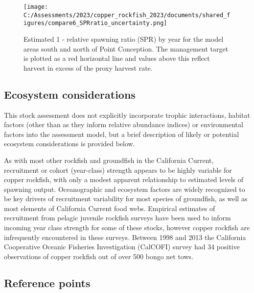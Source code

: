 \documentclass[11pt,
  english,
  letterpaper,
]{article}
\begin{document}


\newpage



\begin{figure}
\centering
\texttt{[image: C:/Assessments/2023/copper\_rockfish\_2023/documents/shared\_figures/compare6\_SPRratio\_uncertainty.png]}
\caption{Estimated 1 - relative spawning ratio (SPR) by year for the model areas south and north of Point Conception. The management target is plotted as a red horizontal line and values above this reflect harvest in excess of the proxy harvest rate.\label{fig:es-1-spr}}
\end{figure}

\pagebreak

\hypertarget{ecosystem-considerations}{%
\subsection*{Ecosystem considerations}\label{ecosystem-considerations}}

This stock assessment does not explicitly incorporate trophic interactions, habitat factors (other than as they inform relative abundance indices) or environmental factors into the assessment model, but a brief description of likely or potential ecosystem considerations is provided below.

As with most other rockfish and groundfish in the California Current, recruitment or cohort (year-class) strength appears to be highly variable for copper rockfish, with only a modest apparent relationship to estimated levels of spawning output. Oceanographic and ecosystem factors are widely recognized to be key drivers of recruitment variability for most species of groundfish, as well as most elements of California Current food webs. Empirical estimates of recruitment from pelagic juvenile rockfish surveys have been used to inform incoming year class strength for some of these stocks, however copper rockfish are infrequently encountered in these surveys. Between 1998 and 2013 the California Cooperative Oceanic Fisheries Investigation (CalCOFI) survey had 34 positive observations of copper rockfish out of over 500 bongo net tows.

\hypertarget{reference-points}{%
\subsection*{Reference points}\label{reference-points}}
\end{document}
